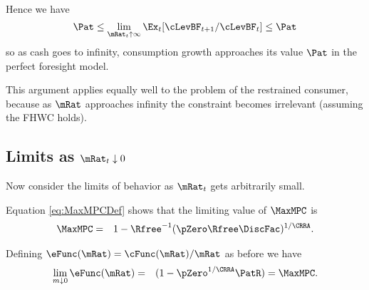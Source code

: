 \documentclass[titlepage]{\econtex}\providecommand{\texname}{BufferStockTheory}
\begin{document}
{Hence we have
\begin{equation}
  {\Pat}  \leq \lim_{\mRat_{t} \uparrow \infty} \Ex_{t}[\cLevBF_{t+1}/\cLevBF_{t}] \leq {\Pat} \nonumber
\end{equation}
so as cash goes to infinity, consumption growth approaches its
value $\Pat$ in the perfect foresight model.

This argument applies equally well to the problem of the restrained
consumer, because as $\mRat$ approaches infinity the constraint becomes
irrelevant (assuming the FHWC holds).

\begin{comment}
Of course, the constraint never becomes irrelevant if human wealth is
infinite.  We ruled out infinite human wealth at the beginning of this
section by assuming $\Rfree> \PGro$.  If this finite human wealth
condition does not hold, it is possible to show that for any finite
horizon consumer the marginal propensity to consume approaches the
finite-horizon perfect foresight MPC as wealth approaches infinity.
However, as the horizon gets longer, the perfect foresight MPC
approaches zero.  It can be shown therefore that the limiting MPC for
the converged consumption function approaches (but never reaches)
zero.  (This is why we chose $\MinMinMPC=0$ if the FHWC fails
in the proofs above.)
\end{comment}

\hypertarget{LimitsAsmtToZero}{}
\subsection{Limits as $\mRat_t \downarrow 0$}

\label{subsec:LimitsAsmtToZero} Now consider the limits of behavior as $\mRat_{t}$ gets
arbitrarily small.

Equation \eqref{eq:MaxMPCDef} shows that the limiting value of
$\MaxMPC$ is
\begin{eqnarray}
 \MaxMPC & = & 1-{\Rfree}^{-1}(\pZero  \Rfree\DiscFac)^{1/\CRRA}. \nonumber
\end{eqnarray}

Defining $\eFunc(\mRat)=\cFunc(\mRat)/\mRat$ as before we have
\begin{eqnarray}
  \lim_{m \downarrow 0} \eFunc(\mRat) & = & (1-\pZero^{1/\CRRA}\PatR) = \MaxMPC \nonumber.
\end{eqnarray}

}
\end{document}

